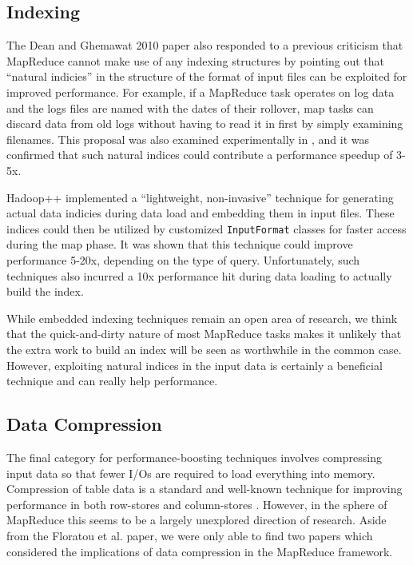 \documentclass[twocolumn]{article}
\begin{document}
\subsection{Indexing}

The Dean and Ghemawat 2010 paper \cite{ref:friends-or-foes-resp} also responded
to a previous criticism that MapReduce cannot make use of any indexing structures
by pointing out that ``natural indicies'' in the structure of the format of input
files can be exploited for improved performance.  For example, if a MapReduce
task operates on log data and the logs files are named with the dates of their
rollover, map tasks can discard data from old logs without having to read it 
in first by simply examining filenames.  This proposal was also examined
experimentally in \cite{ref:perf-study}, and it was confirmed that such
natural indices could contribute a performance speedup of 3-5x.

Hadoop++ \cite{ref:hadoop++} implemented a ``lightweight, non-invasive''
technique for generating actual data indicies during data load and embedding
them in input files.  These indices could then be utilized by customized
\verb+InputFormat+ classes for faster access during the map phase.  It was
shown that this technique could improve performance 5-20x, depending on
the type of query.  Unfortunately, such techniques also incurred a 10x
performance hit during data loading to actually build the index.

While embedded indexing techniques remain an open area of research, we think
that the quick-and-dirty nature of most MapReduce tasks makes it
unlikely that the extra work to build an index will be seen as worthwhile
in the common case.  However, exploiting natural indices in the input
data is certainly a beneficial technique and can really help performance.

\subsection{Data Compression}

The final category for performance-boosting techniques involves compressing
input data so that fewer I/Os are required to load everything into memory.
Compression of table data is a standard and well-known technique for
improving performance in both row-stores and column-stores \cite{ref:colstore-comp}.
However, in the sphere of MapReduce this seems to be a largely unexplored
direction of research.  Aside from the Floratou et al. paper, we were
only able to find two papers which considered the implications of data
compression in the MapReduce framework.
\end{document}
